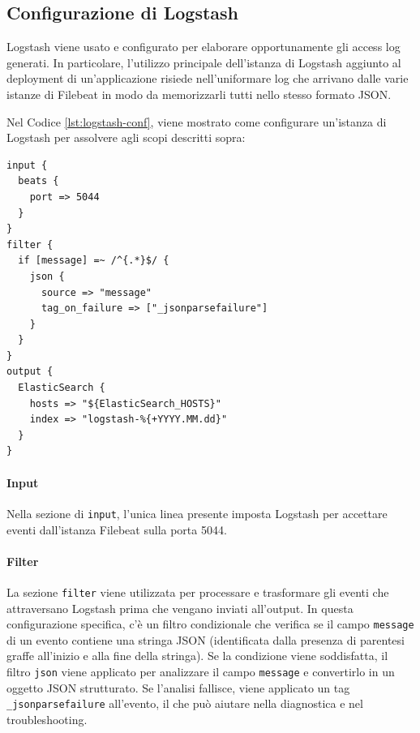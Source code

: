 \subsection{Configurazione di Logstash}\label{subsect:Configurazione di Logstash}
Logstash viene usato e configurato per elaborare opportunamente gli access log generati. In particolare, l'utilizzo principale dell'istanza di Logstash aggiunto al deployment di un'applicazione risiede nell'uniformare log che arrivano dalle varie istanze di Filebeat in modo da memorizzarli tutti nello stesso formato JSON.


Nel Codice \ref{lst:logstash-conf}, viene mostrato come configurare un'istanza di Logstash per assolvere agli scopi descritti sopra:
\begin{lstlisting}[caption={File di configurazione di Logstash.},label=lst:logstash-conf, keywordstyle=\color{black}, commentstyle=\color{black},stringstyle=\color{black},numberstyle=\color{black}]
input {
  beats {
    port => 5044
  }
}
filter {
  if [message] =~ /^{.*}$/ {
    json {
      source => "message"
      tag_on_failure => ["_jsonparsefailure"]
    }
  }
}
output {
  ElasticSearch {
    hosts => "${ElasticSearch_HOSTS}"
    index => "logstash-%{+YYYY.MM.dd}"
  }
}
\end{lstlisting}

\paragraph{Input}

Nella sezione di \texttt{input}, l'unica linea presente imposta Logstash per accettare eventi dall'istanza Filebeat sulla porta 5044.

\paragraph{Filter}

La sezione \texttt{filter} viene utilizzata per processare e trasformare gli eventi che attraversano Logstash prima che vengano inviati all'output. In questa configurazione specifica, c'è un filtro condizionale che verifica se il campo \texttt{message} di un evento contiene una stringa JSON (identificata dalla presenza di parentesi graffe all'inizio e alla fine della stringa). Se la condizione viene soddisfatta, il filtro \texttt{json} viene applicato per analizzare il campo \texttt{message} e convertirlo in un oggetto JSON strutturato. Se l'analisi fallisce, viene applicato un tag \texttt{\_jsonparsefailure} all'evento, il che può aiutare nella diagnostica e nel troubleshooting.

